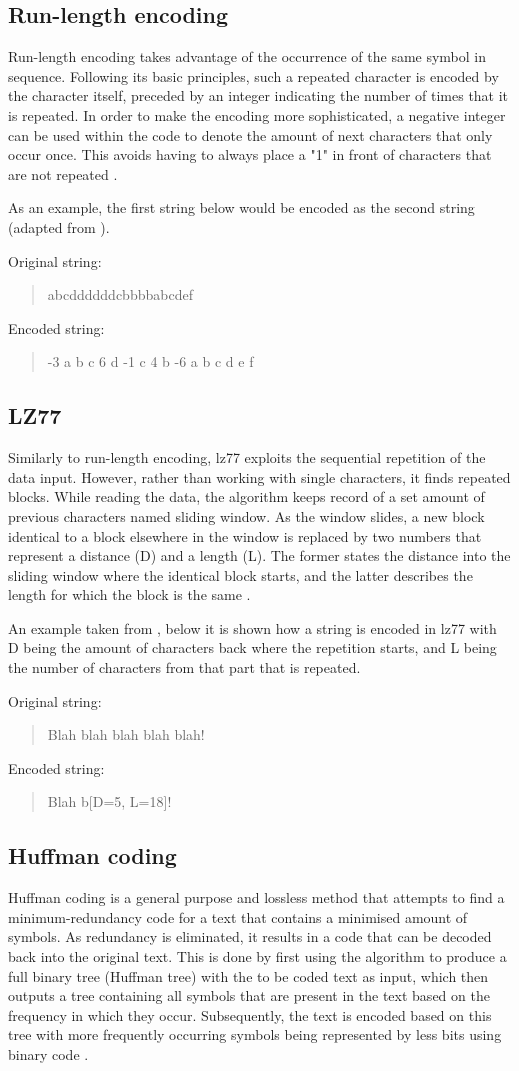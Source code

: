 \subsection{Run-length encoding}
Run-length encoding takes advantage of the occurrence of the same symbol in sequence.
Following its basic principles, such a repeated character is encoded by the character itself, preceded by an integer indicating the number of times that it is repeated.
In order to make the encoding more sophisticated, a negative integer can be used within the code to denote the amount of next characters that only occur once.
This avoids having to always place a "1" in front of characters that are not repeated \citep{bourke}.

As an example, the first string below would be encoded as the second string (adapted from \citet{bourke}).

Original string: 
\blockquote{abcddddddcbbbbabcdef}

Encoded string: 
\blockquote{-3 a b c 6 d -1 c 4 b -6 a b c d e f}

\subsection{LZ77}
Similarly to run-length encoding, \ac{lz77} exploits the sequential repetition of the data input.
However, rather than working with single characters, it finds repeated blocks.
While reading the data, the algorithm keeps record of a set amount of previous characters named sliding window.
As the window slides, a new block identical to a block elsewhere in the window is replaced by two numbers that represent a distance (D) and a length (L).
The former states the distance into the sliding window where the identical block starts, and the latter describes the length for which the block is the same \citep{zlib}.

An example taken from \citet{zlib}, below it is shown how a string is encoded in \ac{lz77} with D being the amount of characters back where the repetition starts, and L being the number of characters from that part that is repeated.

Original string:
\blockquote{Blah blah blah blah blah!}

Encoded string: 
\blockquote{Blah b[D=5, L=18]!}

\subsection{Huffman coding}
\label{sec:huffman}
Huffman coding is a general purpose and lossless method that attempts to find a minimum-redundancy code for a text that contains a minimised amount of symbols.
As redundancy is eliminated, it results in a code that can be decoded back into the original text.
This is done by first using the algorithm to produce a full binary tree (Huffman tree) with the to be coded text as input, which then outputs a tree containing all symbols that are present in the text based on the frequency in which they occur.
Subsequently, the text is encoded based on this tree with more frequently occurring symbols being represented by less bits using binary code \citep{huffman1952method}.

